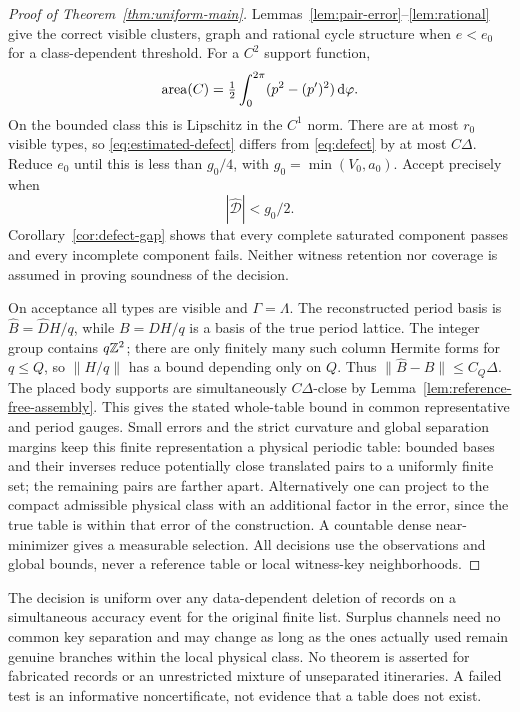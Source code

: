 \begin{proof}[Proof of Theorem~\ref{thm:uniform-main}]
Lemmas~\ref{lem:pair-error}--\ref{lem:rational} give the correct visible
clusters, graph and rational cycle structure when $e<e_0$ for a
class-dependent threshold. For a $C^2$ support function,
\[
 \operatorname{area}(C)=\tfrac12\int_0^{2\pi}(p^2-(p')^2)\,\mathrm d\varphi.
\]
On the bounded class this is Lipschitz in the $C^1$ norm. There are at
most $r_0$ visible types, so \eqref{eq:estimated-defect} differs from
\eqref{eq:defect} by at most $C\Delta$. Reduce $e_0$ until this is
less than $g_0/4$, with $g_0=\min(V_0,a_0)$. Accept precisely when
\begin{equation}\label{eq:acceptance}
                     |\widehat{\mathcal D}|<g_0/2.
\end{equation}
Corollary~\ref{cor:defect-gap} shows that every complete saturated
component passes and every incomplete component fails. Neither witness
retention nor coverage is assumed in proving soundness of the decision.

On acceptance all types are visible and $\Gamma=\Lambda$. The
reconstructed period basis is $\widehat B=\widehat D H/q$, while
$B=DH/q$ is a basis of the true period lattice. The integer group
contains $q\mathbb Z^2$; there are only finitely many such column Hermite
forms for $q\le Q$, so $\|H/q\|$ has a bound depending only on $Q$.
Thus $\|\widehat B-B\|\le C_Q\Delta$. The placed body supports
are simultaneously $C\Delta$-close by Lemma~\ref{lem:reference-free-assembly}.
This gives the stated whole-table bound in common representative and
period gauges. Small errors and the strict curvature and global separation
margins keep this finite representation a physical periodic table:
bounded bases and their inverses reduce potentially close translated
pairs to a uniformly finite set; the remaining pairs are farther apart.
Alternatively one can project to the compact admissible physical class
with an additional factor in the error, since the true table is within
that error of the construction. A countable dense near-minimizer gives
a measurable selection. All decisions use the observations and global
bounds, never a reference table or local witness-key neighborhoods.
\end{proof}

The decision is uniform over any data-dependent deletion of records on
a simultaneous accuracy event for the original finite list. Surplus
channels need no common key separation and may change as long as the
ones actually used remain genuine branches within the local physical
class. No theorem is asserted for fabricated records or an unrestricted
mixture of unseparated itineraries. A failed test is an informative
noncertificate, not evidence that a table does not exist.
